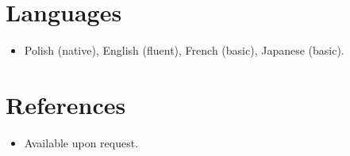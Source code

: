 \documentclass[11pt,a4paper,sans]{moderncv}
\begin{document}

\section{Languages}
\vspace{1pt}
\begin{itemize}
\item {Polish (native), English (fluent), French (basic), Japanese (basic).}
\end{itemize}




\section{References}
\vspace{1pt}
\begin{itemize}
\item{Available upon request.}
\end{itemize}
\end{document}
